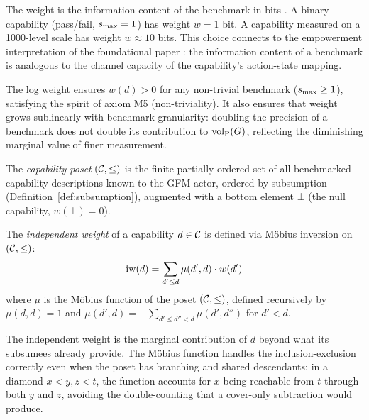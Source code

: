 The weight is the information content of the benchmark in bits
\citep{cover2006elements}. A binary
capability (pass/fail, $s_{\mathrm{max}} = 1$) has weight $w = 1$ bit. A capability
measured on a 1000-level scale has weight $w \approx 10$ bits. This choice
connects to the empowerment interpretation of the foundational paper
\citep{klyubin2005empowerment}: the information content of a benchmark is
analogous to the channel capacity of the capability's action-state mapping.

The log weight ensures $w(d) > 0$ for any non-trivial benchmark ($s_{\mathrm{max}} \geq
1$), satisfying the spirit of axiom M5 (non-triviality). It also ensures that
weight grows sublinearly with benchmark granularity: doubling the precision of
a benchmark does not double its contribution to ${\operatorname{vol}_{\mathrm{P}}}(G)$, reflecting the
diminishing marginal value of finer measurement.


\begin{definition}
\label{def:capability_poset}
The \emph{capability poset} $(\mathcal{C}, \leq)$ is the finite partially ordered
    set of all benchmarked capability descriptions known to the GFM actor,
    ordered by subsumption (Definition~\ref{def:subsumption}), augmented with
    a bottom element $\bot$ (the null capability, $w(\bot) = 0$).
\end{definition}

\begin{definition}
\label{def:independent_weight}
The \emph{independent weight} of a capability $d \in \mathcal{C}$ is defined via
    M\"{o}bius inversion \citep{rota1964foundations} on $(\mathcal{C}, \leq)$:
\begin{equation}
\label{eq:independent_weight}
\operatorname{iw}(d) = \sum_{d' \leq d} \mu(d', d) \cdot w(d')
\end{equation}
where $\mu$ is the M\"{o}bius function of the poset $(\mathcal{C}, \leq)$, defined
    recursively by $\mu(d, d) = 1$ and
    $\mu(d', d) = -\sum_{d' \leq d'' < d} \mu(d', d'')$ for $d' < d$.
\end{definition}

The independent weight is the marginal contribution of $d$ beyond what its
subsumees already provide. The M\"{o}bius function handles the
inclusion-exclusion correctly even when the poset has branching and shared
descendants: in a diamond $x < y, z < t$, the function accounts for $x$ being
reachable from $t$ through both $y$ and $z$, avoiding the double-counting that
a cover-only subtraction would produce.

